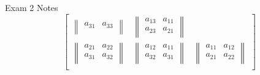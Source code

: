 \begin{cheatsheet}{Exam 2 Notes}
\begin{equation*}
\begin{bmatrix}
\begin{Vmatrix}
                a_{31} & a_{33} \\
            \end{Vmatrix} &
            \begin{Vmatrix}
                a_{13} & a_{11} \\
                a_{23} & a_{21} \\
            \end{Vmatrix} \\
            \begin{Vmatrix}
                a_{21} & a_{22} \\
                a_{31} & a_{32} \\
            \end{Vmatrix} &
            \begin{Vmatrix}
                a_{12} & a_{11} \\
                a_{32} & a_{31} \\
            \end{Vmatrix} & 
            \begin{Vmatrix}
                a_{11} & a_{12} \\
                a_{21} & a_{22} \\
            \end{Vmatrix} \\
        \end{bmatrix}
    \end{equation*}
\end{cheatsheet}